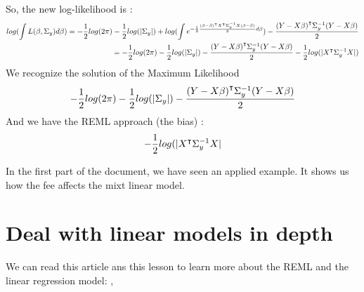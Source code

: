 \documentclass{article}
\begin{document}
\begin{exemple}
\begin{exemple}
So, the new log-likelihood is :
\begin{equation*}
    \begin{split}
       log(\int L(\beta, \Sigma_y)d\beta) = -\frac{1}{2}log(2\pi)-\frac{1}{2}log(|\Sigma_y|)+log(\int e^{-\frac{1}{2}\frac{{(\beta-\hat{\beta})}^\intercal {X}^\intercal \Sigma_y^{-1}X (\beta-\hat{\beta})}{2} d\beta}) -\frac{{(Y-X\beta)}^\intercal\Sigma_y^{-1}(Y-X\beta)}{2}\\
       =-\frac{1}{2}log(2\pi)-\frac{1}{2}log(|\Sigma_y|)-\frac{{(Y-X\beta)}^\intercal\Sigma_y^{-1}(Y-X\beta)}{2} - \frac{1}{2}log(|{X}^\intercal\Sigma_y^{-1}X|)  
    \end{split}
\end{equation*}
We recognize the solution of the Maximum Likelihood
\[-\frac{1}{2}log(2\pi)-\frac{1}{2}log(|\Sigma_y|)-\frac{{(Y-X\beta)}^\intercal\Sigma_y^{-1}(Y-X\beta)}{2}\]
And we have the REML approach (the bias) : \[- \frac{1}{2}log(|{X}^\intercal \Sigma_y^{-1}X|\]
\end{exemple}
In the first part of the document, we have seen an applied example. It shows us how the fee affects the mixt linear model.
\end{exemple}


\section{Deal with linear models in depth}
\label{sec:pour_aller_plus_loin_sur_ce_theme}

We can read this article ans this lesson to learn more about the REML and the linear regression model:
\cite{SITE}, \cite{Teaching}



\end{document}
